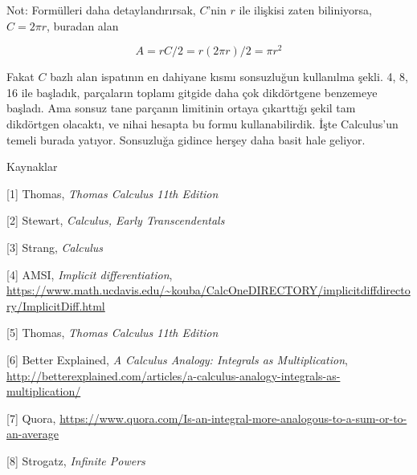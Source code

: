 \documentclass[12pt,fleqn]{article}\usepackage{../../common}
\begin{document}
Not: Formülleri daha detaylandırırsak, $C$'nin $r$ ile ilişkisi zaten
biliniyorsa, $C = 2 \pi r$, buradan alan

$$
A = r C/2 = r (2 \pi r)/2 = \pi r^2 
$$

Fakat $C$ bazlı alan ispatının en dahiyane kısmı sonsuzluğun kullanılma
şekli. 4, 8, 16 ile başladık, parçaların toplamı gitgide daha çok dikdörtgene
benzemeye başladı. Ama sonsuz tane parçanın limitinin ortaya çıkarttığı şekil
tam dikdörtgen olacaktı, ve nihai hesapta bu formu kullanabilirdik. İşte
Calculus'un temeli burada yatıyor. Sonsuzluğa gidince herşey daha basit hale
geliyor.



Kaynaklar

[1] Thomas, {\em Thomas Calculus 11th Edition}

[2] Stewart, {\em Calculus, Early Transcendentals}

[3] Strang, {\em Calculus}

[4] AMSI, {\em Implicit differentiation},
    \url{https://www.math.ucdavis.edu/~kouba/CalcOneDIRECTORY/implicitdiffdirectory/ImplicitDiff.html}

[5] Thomas, {\em Thomas Calculus 11th Edition}

[6] Better Explained, {\em A Calculus Analogy: Integrals as  Multiplication},
    \url{http://betterexplained.com/articles/a-calculus-analogy-integrals-as-multiplication/}

[7] Quora, \url{https://www.quora.com/Is-an-integral-more-analogous-to-a-sum-or-to-an-average}

[8] Strogatz, {\em Infinite Powers}
\end{document}
